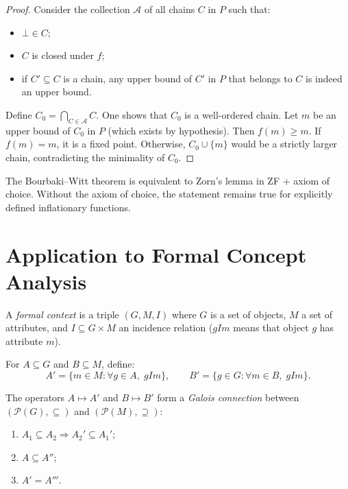 \begin{proof}
Consider the collection $\mathcal{A}$ of all chains $C$ in $P$ such that:
\begin{itemize}
  \item $\bot \in C$;
  \item $C$ is closed under $f$;
  \item if $C' \subseteq C$ is a chain, any upper bound of $C'$ in $P$ that belongs to
    $C$ is indeed an upper bound.
\end{itemize}
Define $C_0 = \bigcap_{C \in \mathcal{A}} C$. One shows that $C_0$ is a well-ordered
chain. Let $m$ be an upper bound of $C_0$ in $P$ (which exists by hypothesis). Then
$f(m) \geq m$. If $f(m) = m$, it is a fixed point. Otherwise, $C_0 \cup \{m\}$ would be a
strictly larger chain, contradicting the minimality of $C_0$.
\end{proof}

\begin{remark}
The Bourbaki--Witt theorem is equivalent to Zorn's lemma in ZF + axiom of choice. Without
the axiom of choice, the statement remains true for explicitly defined inflationary
functions.
\end{remark}

\section{Application to Formal Concept Analysis}

\begin{definition}
A \emph{formal context} is a triple $(G, M, I)$ where $G$ is a set of objects, $M$ a set
of attributes, and $I \subseteq G \times M$ an incidence relation ($gIm$ means that
object $g$ has attribute $m$).
\end{definition}

\begin{definition}
For $A \subseteq G$ and $B \subseteq M$, define:
\[
  A' = \{m \in M : \forall g \in A, \; gIm\}, \qquad
  B' = \{g \in G : \forall m \in B, \; gIm\}.
\]
\end{definition}

\begin{proposition}
The operators $A \mapsto A'$ and $B \mapsto B'$ form a \emph{Galois connection} between
$(\mathcal{P}(G), \subseteq)$ and $(\mathcal{P}(M), \supseteq)$:
\begin{enumerate}
  \item $A_1 \subseteq A_2 \Rightarrow A_2' \subseteq A_1'$;
  \item $A \subseteq A''$;
  \item $A' = A'''$.
\end{enumerate}
\end{proposition}

